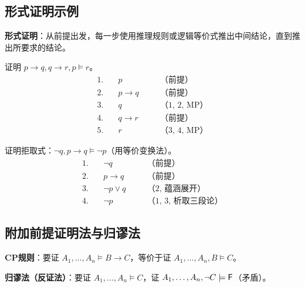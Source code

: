\subsection{形式证明示例}

\textbf{形式证明}：从前提出发，每一步使用推理规则或逻辑等价式推出中间结论，直到推出所要求的结论。

\begin{example}
证明 $p \rightarrow q, q \rightarrow r, p \models r$。
\[
\begin{aligned}
1.\quad &p &\quad &\text{（前提）} \\
2.\quad &p \rightarrow q &\quad &\text{（前提）} \\
3.\quad &q &\quad &\text{（1, 2, MP）} \\
4.\quad &q \rightarrow r &\quad &\text{（前提）} \\
5.\quad &r &\quad &\text{（3, 4, MP）}
\end{aligned}
\]
\end{example}

\begin{example}
证明拒取式：$\neg q, p \rightarrow q \models \neg p$（用等价变换法）。
\[
\begin{aligned}
1.\quad &\neg q &\quad &\text{（前提）} \\
2.\quad &p \rightarrow q &\quad &\text{（前提）} \\
3.\quad &\neg p \lor q &\quad &\text{（2, 蕴涵展开）} \\
4.\quad &\neg p &\quad &\text{（1, 3, 析取三段论）}
\end{aligned}
\]
\end{example}

\subsection{附加前提证明法与归谬法}

\textbf{CP规则}：要证 $A_1, \dots, A_n \models B \rightarrow C$，等价于证 $A_1, \dots, A_n, B \models C$。

\textbf{归谬法（反证法）}：要证 $A_1, \dots, A_n \models C$，证 $A_1, \dots, A_n, \neg C \models \mathsf{F}$（矛盾）。


